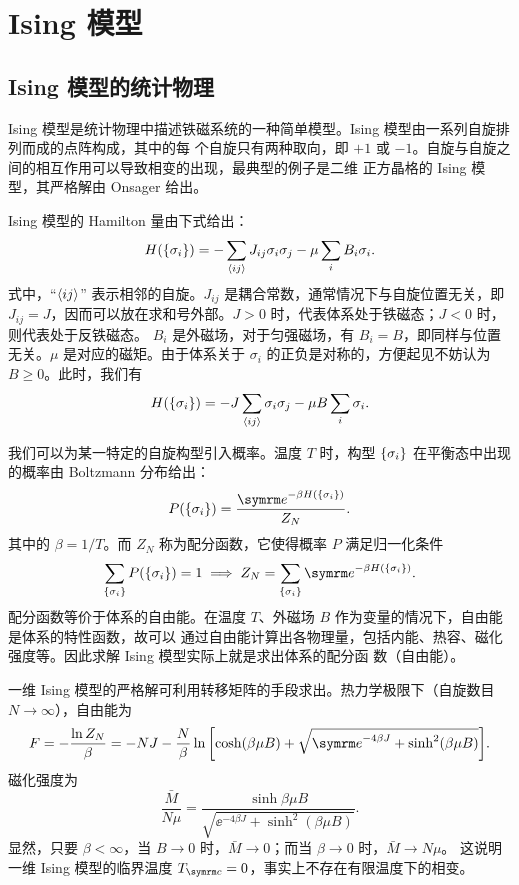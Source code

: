 \chapter{Ising 模型}

\section{Ising 模型的统计物理}

Ising 模型是统计物理中描述铁磁系统的一种简单模型。Ising 模型由一系列自旋排列而成的点阵构成，其中的每
个自旋只有两种取向，即 $+1$ 或 $-1$。自旋与自旋之间的相互作用可以导致相变的出现，最典型的例子是二维
正方晶格的 Ising 模型，其严格解由 Onsager 给出。

Ising 模型的 Hamilton 量由下式给出：
\begin{equation}
  H({\{\sigma_i\}}) = -\sum_{\langle ij\rangle} J_{ij}\sigma_i\sigma_j - \mu \sum_{i} B_i\sigma_i.
\end{equation}
式中，“$\langle ij\rangle$” 表示相邻的自旋。$J_{ij}$ 是耦合常数，通常情况下与自旋位置无关，即
$J_{ij}=J$，因而可以放在求和号外部。$J>0$ 时，代表体系处于铁磁态；$J<0$ 时，则代表处于反铁磁态。
$B_i$ 是外磁场，对于匀强磁场，有 $B_i=B$，即同样与位置无关。$\mu$ 是对应的磁矩。由于体系关于
$\sigma_i$ 的正负是对称的，方便起见不妨认为 $B \geqslant 0$。此时，我们有
\begin{equation}
  H({\{\sigma_i\}}) = -J \sum_{\langle ij\rangle} \sigma_i\sigma_j - \mu B \sum_{i} \sigma_i.
\end{equation}

我们可以为某一特定的自旋构型引入概率。温度 $T$ 时，构型 ${\{\sigma_i\}}$ 在平衡态中出现的概率由
Boltzmann 分布给出：
\begin{equation}
  \label{eq:ising-probability}
  P(\q{\sigma_i}) = \frac{\ee^{-\beta H(\q{\sigma_i})}}{Z_N}.
\end{equation}
其中的 $\beta=1/T$。而 $Z_N$ 称为配分函数，它使得概率 $P$ 满足归一化条件
\begin{equation}
  \sum_\q{\sigma_i} P(\q{\sigma_i}) = 1
  \implies Z_N = \sum_\q{\sigma_i} \ee^{-\beta H(\q{\sigma_i})}.
\end{equation}
配分函数等价于体系的自由能。在温度 $T$、外磁场 $B$ 作为变量的情况下，自由能是体系的特性函数，故可以
通过自由能计算出各物理量，包括内能、热容、磁化强度等。因此求解 Ising 模型实际上就是求出体系的配分函
数（自由能）。

一维 Ising 模型的严格解可利用转移矩阵的手段求出。热力学极限下（自旋数目 $N\to\infty$），自由能为
\begin{equation}
  F = - \frac{\ln Z_N}{\beta}
    = - N J - \frac{N}{\beta}
              \ln\qty[\cosh(\beta\mu B) + \sqrt{\ee^{-4\beta J} + \sinh^2(\beta\mu B)}].
\end{equation}
磁化强度为
\begin{equation}
  \frac{\bar{M}}{N\mu} = \frac{\sinh{\beta\mu B}}{\sqrt{\ee^{-4\beta J} + \sinh^2(\beta\mu B)}}.
\end{equation}
显然，只要 $\beta<\infty$，当 $B\to 0$ 时，$\bar{M}\to 0$；而当 $\beta\to 0$ 时，$\bar{M}\to N\mu$。
这说明一维 Ising 模型的临界温度 $\Tc=0$，事实上不存在有限温度下的相变。

